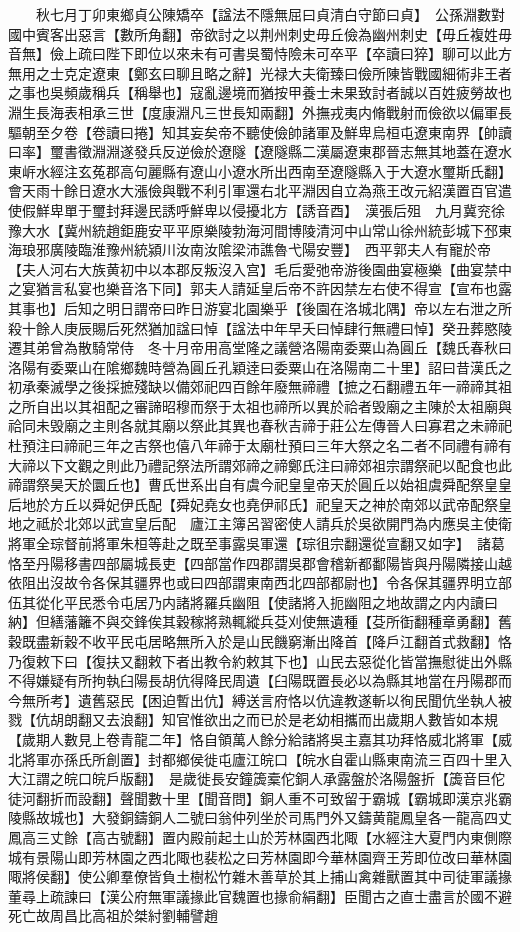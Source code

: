 　　秋七月丁卯東鄉貞公陳矯卒【諡法不隱無屈曰貞清白守節曰貞】　公孫淵數對國中賓客出惡言【數所角翻】帝欲討之以荆州刺史毋丘儉為幽州刺史【毋丘複姓毋音無】儉上疏曰陛下即位以來未有可書吳蜀恃險未可卒平【卒讀曰猝】聊可以此方無用之士克定遼東【鄭玄曰聊且略之辭】光禄大夫衛臻曰儉所陳皆戰國細術非王者之事也吳頻歲稱兵【稱舉也】寇亂邊境而猶按甲養士未果致討者誠以百姓疲勞故也淵生長海表相承三世【度康淵凡三世長知兩翻】外撫戎夷内脩戰射而儉欲以偏軍長驅朝至夕卷【卷讀曰捲】知其妄矣帝不聽使儉帥諸軍及鮮卑烏桓屯遼東南界【帥讀曰率】璽書徵淵淵遂發兵反逆儉於遼隧【遼隧縣二漢屬遼東郡晉志無其地蓋在遼水東㟁水經注玄菟郡高句麗縣有遼山小遼水所出西南至遼隧縣入于大遼水璽斯氏翻】會天雨十餘日遼水大漲儉與戰不利引軍還右北平淵因自立為燕王改元紹漢置百官遣使假鮮卑單于璽封拜邊民誘呼鮮卑以侵擾北方【誘音酉】　漢張后殂　九月冀兖徐豫大水【冀州統趙鉅鹿安平平原樂陵勃海河間博陵清河中山常山徐州統彭城下邳東海琅邪廣陵臨淮豫州統潁川汝南汝隂梁沛譙魯弋陽安豐】　西平郭夫人有寵於帝【夫人河右大族黄初中以本郡反叛沒入宫】毛后愛弛帝游後園曲宴極樂【曲宴禁中之宴猶言私宴也樂音洛下同】郭夫人請延皇后帝不許因禁左右使不得宣【宣布也露其事也】后知之明日謂帝曰昨日游宴北園樂乎【後園在洛城北隅】帝以左右泄之所殺十餘人庚辰賜后死然猶加諡曰悼【諡法中年早夭曰悼肆行無禮曰悼】癸丑葬愍陵遷其弟曾為散騎常侍　冬十月帝用高堂隆之議營洛陽南委粟山為圓丘【魏氏春秋曰洛陽有委粟山在隂鄉魏時營為圓丘孔穎逹曰委粟山在洛陽南二十里】詔曰昔漢氏之初承秦滅學之後採摭殘缺以備郊祀四百餘年廢無禘禮【摭之石翻禮五年一禘禘其祖之所自出以其祖配之審諦昭穆而祭于太祖也禘所以異於祫者毁廟之主陳於太祖廟與祫同未毁廟之主則各就其廟以祭此其異也春秋吉禘于莊公左傳晉人曰寡君之未禘祀杜預注曰禘祀三年之吉祭也僖八年禘于太廟杜預曰三年大祭之名二者不同禮有禘有大禘以下文觀之則此乃禮記祭法所謂郊禘之禘鄭氏注曰禘郊祖宗謂祭祀以配食也此禘謂祭昊天於圜丘也】曹氏世系出自有虞今祀皇皇帝天於圓丘以始祖虞舜配祭皇皇后地於方丘以舜妃伊氏配【舜妃堯女也堯伊祁氏】祀皇天之神於南郊以武帝配祭皇地之祗於北郊以武宣皇后配　廬江主簿呂習密使人請兵於吳欲開門為内應吳主使衛將軍全琮督前將軍朱桓等赴之既至事露吳軍還【琮徂宗翻還從宣翻又如字】　諸葛恪至丹陽移書四部屬城長吏【四部當作四郡謂吳郡會稽新都鄱陽皆與丹陽隣接山越依阻出沒故令各保其疆界也或曰四部謂東南西北四部都尉也】令各保其疆界明立部伍其從化平民悉令屯居乃内諸將羅兵幽阻【使諸將入扼幽阻之地故謂之内内讀曰納】但繕藩籬不與交鋒俟其穀稼將熟輒縱兵芟刈使無遺種【芟所衘翻種章勇翻】舊穀既盡新穀不收平民屯居略無所入於是山民饑窮漸出降首【降戶江翻首式救翻】恪乃復敕下曰【復扶又翻敕下者出教令約敕其下也】山民去惡從化皆當撫慰徙出外縣不得嫌疑有所拘執臼陽長胡伉得降民周遺【臼陽既置長必以為縣其地當在丹陽郡而今無所考】遺舊惡民【困迫暫出伉】縛送言府恪以伉違教遂斬以徇民聞伉坐執人被戮【伉胡朗翻又去浪翻】知官惟欲出之而已於是老幼相攜而出歲期人數皆如本規【歲期人數見上卷青龍二年】恪自領萬人餘分給諸將吳主嘉其功拜恪威北將軍【威北將軍亦孫氏所創置】封都鄉侯徙屯廬江皖口【皖水自霍山縣東南流三百四十里入大江謂之皖口皖戶版翻】　是歲徙長安鐘簴槖佗銅人承露盤於洛陽盤折【簴音巨佗徒河翻折而設翻】聲聞數十里【聞音問】銅人重不可致留于霸城【霸城即漢京兆霸陵縣故城也】大發銅鑄銅人二號曰翁仲列坐於司馬門外又鑄黄龍鳳皇各一龍高四丈鳳高三丈餘【高古號翻】置内殿前起土山於芳林園西北陬【水經注大夏門内東側際城有景陽山即芳林園之西北陬也裴松之曰芳林園即今華林園齊王芳即位改曰華林園陬將侯翻】使公卿羣僚皆負土樹松竹雜木善草於其上捕山禽雜獸置其中司徒軍議掾董尋上疏諫曰【漢公府無軍議掾此官魏置也掾俞絹翻】臣聞古之直士盡言於國不避死亡故周昌比高祖於桀紂劉輔譬趙